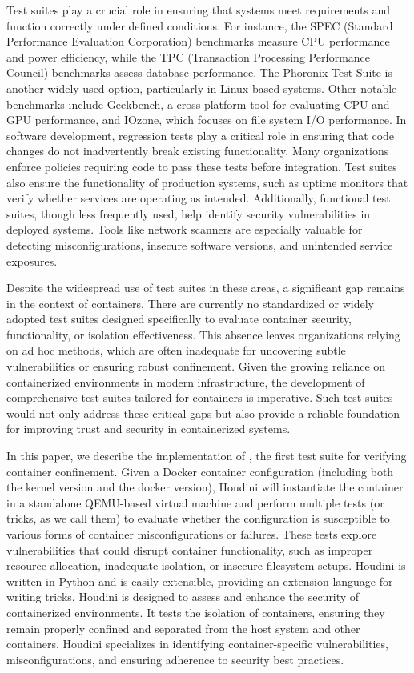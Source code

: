 Test suites play a crucial role in ensuring that systems meet requirements and function correctly under defined conditions. For instance, the SPEC (Standard Performance Evaluation Corporation) benchmarks measure CPU performance and power efficiency, while the TPC (Transaction Processing Performance Council) benchmarks assess database performance. The Phoronix Test Suite is another widely used option, particularly in Linux-based systems. Other notable benchmarks include Geekbench, a cross-platform tool for evaluating CPU and GPU performance, and IOzone, which focuses on file system I/O performance. In software development, regression tests play a critical role in ensuring that code changes do not inadvertently break existing functionality. Many organizations enforce policies requiring code to pass these tests before integration. Test suites also ensure the functionality of production systems, such as uptime monitors that verify whether services are operating as intended. Additionally, functional test suites, though less frequently used, help identify security vulnerabilities in deployed systems. Tools like network scanners are especially valuable for detecting misconfigurations, insecure software versions, and unintended service exposures.

Despite the widespread use of test suites in these areas, a significant gap remains in the context of containers. There are currently no standardized or widely adopted test suites designed specifically to evaluate container security, functionality, or isolation effectiveness. This absence leaves organizations relying on ad hoc methods, which are often inadequate for uncovering subtle vulnerabilities or ensuring robust confinement. Given the growing reliance on containerized environments in modern infrastructure, the development of comprehensive test suites tailored for containers is imperative. Such test suites would not only address these critical gaps but also provide a reliable foundation for improving trust and security in containerized systems.

In this paper, we describe the implementation of \houdini, the first test suite for verifying container confinement. Given a Docker container configuration (including both the kernel version and the docker version), Houdini will instantiate the container in a standalone QEMU-based virtual machine and perform multiple tests (or tricks, as we call them) to evaluate whether the configuration is susceptible to various forms of container misconfigurations or failures. These tests explore vulnerabilities that could disrupt container functionality, such as improper resource allocation, inadequate isolation, or insecure filesystem setups. Houdini is written in Python and is easily extensible, providing an extension language for writing tricks. Houdini is designed to assess and enhance the security of containerized environments. It tests the isolation of containers, ensuring they remain properly confined and separated from the host system and other containers. Houdini specializes in identifying container-specific vulnerabilities, misconfigurations, and ensuring adherence to security best practices.

